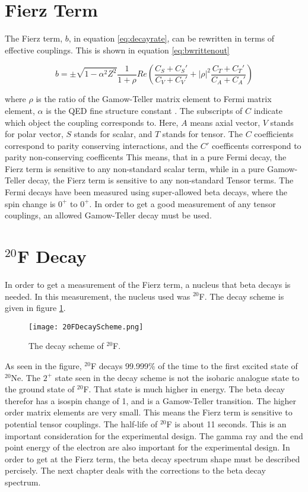 \section{Fierz Term}
The Fierz term, $b$, in equation \ref{eq:decayrate}, can be rewritten in terms of effective couplings.
This is shown in equation \ref{eq:bwrittenout}

\begin{equation}
	b =  \pm \sqrt{1 - \alpha^{2}{Z^{2}}}\frac{1}{1 + \rho}Re(\frac{C_{S} + C_{S}'}{C_{V} + C_{V}'} + |\rho|^{2}\frac{C_{T} + C_{T}'}{C_{A} + C_{A}'})
	\label{eq:bwrittenout}
\end{equation}

where $\rho$ is the ratio of the Gamow-Teller matrix element to Fermi matrix element, $\alpha$ is the QED fine structure constant \cite{OSCARPAPER}. 
The subscripts of $C$ indicate which object the coupling corresponds to. 
Here, $A$ means axial vector, $V$ stands for polar vector, $S$ stands for scalar, and $T$ stands for tensor. 
The $C$ coefficients correspond to parity conserving interactions, and the $C'$ coefficents correspond to parity non-conserving coefficents \cite{Lee56}
This means, that in a pure Fermi decay, the Fierz term is sensitive to any non-standard scalar term, while in a pure Gamow-Teller decay, the Fierz term is sensitive to any non-standard Tensor terms. 
The Fermi decays have been measured using super-allowed beta decays, where the spin change is $0^{+}$ to $0^{+}$. 
In order to get a good measurement of any tensor couplings, an allowed Gamow-Teller decay must be used. 

\section{$^{20}$F Decay}
In order to get a measurement of the Fierz term, a nucleus that beta decays is needed.
In this measurement, the nucleus used was $^{20}$F.
The decay scheme is given in figure \ref{fig:DecayScheme}.

\begin{figure}[!htb]
	\centerline{\texttt{[image: 20FDecayScheme.png]}}
	\caption{The decay scheme of $^{20}$F.}
	\label{fig:DecayScheme}
\end{figure}

As seen in the figure, $^{20}$F decays 99.999\% of the time to the first excited state of $^{20}$Ne.
The $2^{+}$ state seen in the decay scheme is not the isobaric analogue state to the ground state of $^{20}$F.
That state is much higher in energy.
The beta decay therefor has a isospin change of 1, and is a Gamow-Teller transition.
The higher order matrix elements are very small.
This means the Fierz term is sensitive to potential tensor couplings.
The half-life of $^{20}$F is about 11 seconds. 
This is an important consideration for the experimental design.
The gamma ray and the end point energy of the electron are also important for the experimental design.
In order to get at the Fierz term, the beta decay spectrum shape must be described percisely.
The next chapter deals with the corrections to the beta decay spectrum.  

